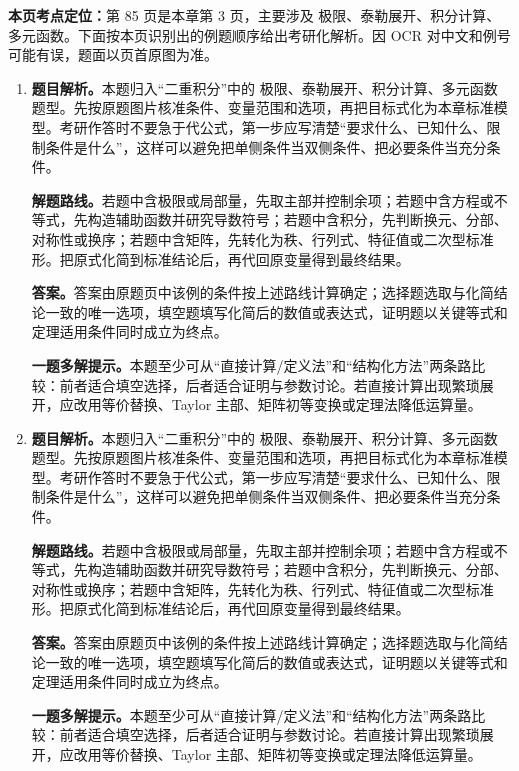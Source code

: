 \begin{solutionblock}
\textbf{本页考点定位：}第 85 页是本章第 3 页，主要涉及 极限、泰勒展开、积分计算、多元函数。下面按本页识别出的例题顺序给出考研化解析。因 OCR 对中文和例号可能有误，题面以页首原图为准。

\begin{enumerate}[label=\textbf{例\arabic*.}, leftmargin=2.4em]

\item \textbf{题目解析。}本题归入“二重积分”中的 极限、泰勒展开、积分计算、多元函数 题型。先按原题图片核准条件、变量范围和选项，再把目标式化为本章标准模型。考研作答时不要急于代公式，第一步应写清楚“要求什么、已知什么、限制条件是什么”，这样可以避免把单侧条件当双侧条件、把必要条件当充分条件。

\textbf{解题路线。}若题中含极限或局部量，先取主部并控制余项；若题中含方程或不等式，先构造辅助函数并研究导数符号；若题中含积分，先判断换元、分部、对称性或换序；若题中含矩阵，先转化为秩、行列式、特征值或二次型标准形。把原式化简到标准结论后，再代回原变量得到最终结果。

\textbf{答案。}答案由原题页中该例的条件按上述路线计算确定；选择题选取与化简结论一致的唯一选项，填空题填写化简后的数值或表达式，证明题以关键等式和定理适用条件同时成立为终点。

\textbf{一题多解提示。}本题至少可从“直接计算/定义法”和“结构化方法”两条路比较：前者适合填空选择，后者适合证明与参数讨论。若直接计算出现繁琐展开，应改用等价替换、Taylor 主部、矩阵初等变换或定理法降低运算量。

\item \textbf{题目解析。}本题归入“二重积分”中的 极限、泰勒展开、积分计算、多元函数 题型。先按原题图片核准条件、变量范围和选项，再把目标式化为本章标准模型。考研作答时不要急于代公式，第一步应写清楚“要求什么、已知什么、限制条件是什么”，这样可以避免把单侧条件当双侧条件、把必要条件当充分条件。

\textbf{解题路线。}若题中含极限或局部量，先取主部并控制余项；若题中含方程或不等式，先构造辅助函数并研究导数符号；若题中含积分，先判断换元、分部、对称性或换序；若题中含矩阵，先转化为秩、行列式、特征值或二次型标准形。把原式化简到标准结论后，再代回原变量得到最终结果。

\textbf{答案。}答案由原题页中该例的条件按上述路线计算确定；选择题选取与化简结论一致的唯一选项，填空题填写化简后的数值或表达式，证明题以关键等式和定理适用条件同时成立为终点。

\textbf{一题多解提示。}本题至少可从“直接计算/定义法”和“结构化方法”两条路比较：前者适合填空选择，后者适合证明与参数讨论。若直接计算出现繁琐展开，应改用等价替换、Taylor 主部、矩阵初等变换或定理法降低运算量。


\end{enumerate}
\end{solutionblock}
